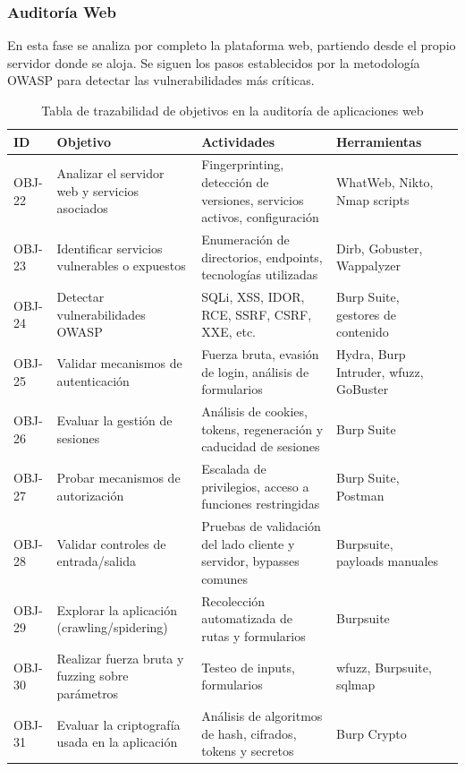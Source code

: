 \documentclass[a4paper, 10pt]{article}
\begin{document}
\subsubsection{Auditoría Web}

En esta fase se analiza por completo la plataforma web, partiendo desde el propio servidor donde se aloja. Se siguen los pasos establecidos por la metodología OWASP para detectar las vulnerabilidades más críticas.

\begin{table}[H]
\centering
\renewcommand{\arraystretch}{1.4}
\begin{tabular}{|p{1.2cm}|p{4cm}|p{4.8cm}|p{3.8cm}|p{2.5cm}|}
\hline
\textbf{ID} & \textbf{Objetivo} & \textbf{Actividades} & \textbf{Herramientas}  \\
\hline
OBJ-22 & Analizar el servidor web y servicios asociados & Fingerprinting, detección de versiones, servicios activos, configuración & WhatWeb, Nikto, Nmap scripts  \\
\hline
OBJ-23 & Identificar servicios vulnerables o expuestos & Enumeración de directorios, endpoints, tecnologías utilizadas & Dirb, Gobuster, Wappalyzer  \\
\hline
OBJ-24 & Detectar vulnerabilidades OWASP & SQLi, XSS, IDOR, RCE, SSRF, CSRF, XXE, etc. & Burp Suite, gestores de contenido \\
\hline
OBJ-25 & Validar mecanismos de autenticación & Fuerza bruta, evasión de login, análisis de formularios & Hydra, Burp Intruder, wfuzz, GoBuster  \\
\hline
OBJ-26 & Evaluar la gestión de sesiones & Análisis de cookies, tokens, regeneración y caducidad de sesiones &  Burp Suite  \\
\hline
OBJ-27 & Probar mecanismos de autorización & Escalada de privilegios, acceso a funciones restringidas & Burp Suite, Postman \\
\hline
OBJ-28 & Validar controles de entrada/salida & Pruebas de validación del lado cliente y servidor, bypasses comunes & Burpsuite, payloads manuales  \\
\hline
OBJ-29 & Explorar la aplicación (crawling/spidering) & Recolección automatizada de rutas y formularios & Burpsuite \\
\hline
OBJ-30 & Realizar fuerza bruta y fuzzing sobre parámetros & Testeo de inputs, formularios & wfuzz, Burpsuite, sqlmap  \\
\hline
OBJ-31 & Evaluar la criptografía usada en la aplicación & Análisis de algoritmos de hash, cifrados, tokens y secretos & Burp Crypto  \\
\hline
\end{tabular}
\caption{Tabla de trazabilidad de objetivos en la auditoría de aplicaciones web}
\end{table}
\end{document}
